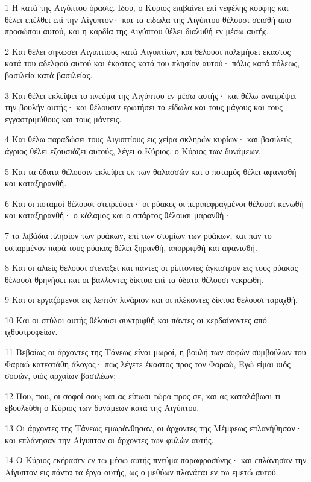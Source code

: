 \par 1 Η κατά της Αιγύπτου όρασις. Ιδού, ο Κύριος επιβαίνει επί νεφέλης κούφης και θέλει επέλθει επί την Αίγυπτον· και τα είδωλα της Αιγύπτου θέλουσι σεισθή από προσώπου αυτού, και η καρδία της Αιγύπτου θέλει διαλυθή εν μέσω αυτής.
\par 2 Και θέλει σηκώσει Αιγυπτίους κατά Αιγυπτίων, και θέλουσι πολεμήσει έκαστος κατά του αδελφού αυτού και έκαστος κατά του πλησίον αυτού· πόλις κατά πόλεως, βασιλεία κατά βασιλείας.
\par 3 Και θέλει εκλείψει το πνεύμα της Αιγύπτου εν μέσω αυτής· και θέλω ανατρέψει την βουλήν αυτής· και θέλουσιν ερωτήσει τα είδωλα και τους μάγους και τους εγγαστριμύθους και τους μάντεις.
\par 4 Και θέλω παραδώσει τους Αιγυπτίους εις χείρα σκληρών κυρίων· και βασιλεύς άγριος θέλει εξουσιάζει αυτούς, λέγει ο Κύριος, ο Κύριος των δυνάμεων.
\par 5 Και τα ύδατα θέλουσιν εκλείψει εκ των θαλασσών και ο ποταμός θέλει αφανισθή και καταξηρανθή.
\par 6 Και οι ποταμοί θέλουσι στειρεύσει· οι ρύακες οι περιπεφραγμένοι θέλουσι κενωθή και καταξηρανθή· ο κάλαμος και ο σπάρτος θέλουσι μαρανθή·
\par 7 τα λιβάδια πλησίον των ρυάκων, επί των στομίων των ρυάκων, και παν το εσπαρμένον παρά τους ρύακας θέλει ξηρανθή, απορριφθή και αφανισθή.
\par 8 Και οι αλιείς θέλουσι στενάξει και πάντες οι ρίπτοντες άγκιστρον εις τους ρύακας θέλουσι θρηνήσει και οι βάλλοντες δίκτυα επί τα ύδατα θέλουσι νεκρωθή.
\par 9 Και οι εργαζόμενοι εις λεπτόν λινάριον και οι πλέκοντες δίκτυα θέλουσι ταραχθή.
\par 10 Και οι στύλοι αυτής θέλουσι συντριφθή και πάντες οι κερδαίνοντες από ιχθυοτροφείων.
\par 11 Βεβαίως οι άρχοντες της Τάνεως είναι μωροί, η βουλή των σοφών συμβούλων του Φαραώ κατεστάθη άλογος· πως λέγετε έκαστος προς τον Φαραώ, Εγώ είμαι υιός σοφών, υιός αρχαίων βασιλέων;
\par 12 Που, που, οι σοφοί σου; και ας είπωσι τώρα προς σε, και ας καταλάβωσι τι εβουλεύθη ο Κύριος των δυνάμεων κατά της Αιγύπτου.
\par 13 Οι άρχοντες της Τάνεως εμωράνθησαν, οι άρχοντες της Μέμφεως επλανήθησαν· και επλάνησαν την Αίγυπτον οι άρχοντες των φυλών αυτής.
\par 14 Ο Κύριος εκέρασεν εν τω μέσω αυτής πνεύμα παραφροσύνης· και επλάνησαν την Αίγυπτον εις πάντα τα έργα αυτής, ως ο μεθύων πλανάται εν τω εμετώ αυτού.
